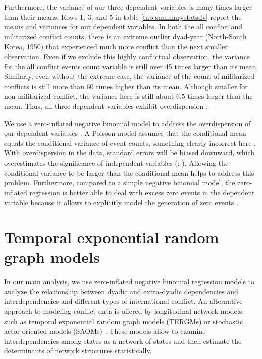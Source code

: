 \documentclass[12pt]{article}
\theoremstyle{hypothesis}
\begin{document}


Furthermore, the variance of our three dependent variables is many times larger than their means. Rows 1, 3, and 5 in table \ref{tab:summarystatsdv} report the means and variances for our dependent variables. In both the all conflict and militarized conflict counts, there is an extreme outlier dyad-year (North-South Korea, 1950) that experienced much more conflict than the next smaller observation. Even if we exclude this highly conflictual observation, the variance for the all conflict events count variable is still over 45 times larger than its mean. Similarly, even without the extreme case, the variance of the count of militarized conflicts is still more than 60 times higher than its mean. Although smaller for non-militarized conflict, the variance here is still about $6.5$ times larger than the mean. Thus, all three dependent variables exhibit overdispersion \citep[218]{Long:1997}.

We use a zero-inflated negative binomial model to address the overdispersion of our dependent variables \citep{Long:1997,Cameron:2013}. A Poisson model assumes that the conditional mean equals the conditional variance of event counts, something clearly incorrect here \citep[218-223]{Long:1997}. With overdispersion in the data, standard errors will be biased downward, which overestimates the significance of independent variables (\citealp[31]{Cameron:1986}; \citealp[230]{Long:1997}). Allowing the conditional variance to be larger than the conditional mean helps to address this problem. Furthermore, compared to a simple negative binomial model, the zero-inflated regression is better able to deal with excess zero events in the dependent variable because it allows to explicitly model the generation of zero events \citep[242]{Long:1997}.

\newpage

\section{Temporal exponential random graph models}

\doublespace In our main analysis, we use zero-inflated negative binomial regression models to analyze the relationship between dyadic and extra-dyadic dependencies and interdependencies and different types of international conflict. An alternative approach to modeling conflict data is offered by longitudinal network models, such as temporal exponential random graph models (TERGMs) or stochastic actor-oriented models (SAOMs) \citep{Hanneke:2010, Cranmer:2011,Snijders:1996}. These models allow to examine interdependencies among states as a network of states and then estimate the determinants of network structures statistically.
\end{document}
